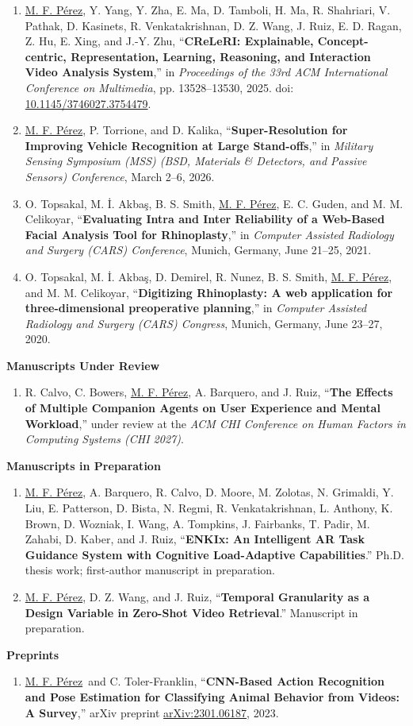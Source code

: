 \documentclass[11pt,letterpaper]{article}
\newcommand{\cvsubsection}[1]{\par\addvspace{7pt}\Needspace{4\baselineskip}\textbf{#1}\par\nobreak\vspace{1pt}}
\newcommand{\pubtitle}[1]{\textbf{#1}}
\newcommand{\me}{\underline{M. F. Pérez}}
\begin{document}
\begin{enumerate}
\item \me, Y. Yang, Y. Zha, E. Ma, D. Tamboli, H. Ma, R. Shahriari, V. Pathak, D. Kasinets, R. Venkatakrishnan, D. Z. Wang, J. Ruiz, E. D. Ragan, Z. Hu, E. Xing, and J.-Y. Zhu, ``\pubtitle{CReLeRI: Explainable, Concept-centric, Representation, Learning, Reasoning, and Interaction Video Analysis System},'' in \textit{Proceedings of the 33rd ACM International Conference on Multimedia}, pp. 13528–13530, 2025. doi: \href{https://doi.org/10.1145/3746027.3754479}{10.1145/3746027.3754479}.
\item \me, P. Torrione, and D. Kalika, ``\pubtitle{Super-Resolution for Improving Vehicle Recognition at Large Stand-offs},'' in \textit{Military Sensing Symposium (MSS) (BSD, Materials \& Detectors, and Passive Sensors) Conference}, March 2–6, 2026.
\item O. Topsakal, M. İ. Akbaş, B. S. Smith, \me, E. C. Guden, and M. M. Celikoyar, ``\pubtitle{Evaluating Intra and Inter Reliability of a Web-Based Facial Analysis Tool for Rhinoplasty},'' in \textit{Computer Assisted Radiology and Surgery (CARS) Conference}, Munich, Germany, June 21–25, 2021.
\item O. Topsakal, M. İ. Akbaş, D. Demirel, R. Nunez, B. S. Smith, \me, and M. M. Celikoyar, ``\pubtitle{Digitizing Rhinoplasty: A web application for three-dimensional preoperative planning},'' in \textit{Computer Assisted Radiology and Surgery (CARS) Congress}, Munich, Germany, June 23–27, 2020.
\end{enumerate}
\cvsubsection{Manuscripts Under Review}
\begin{enumerate}
\item R. Calvo, C. Bowers, \me, A. Barquero, and J. Ruiz, ``\pubtitle{The Effects of Multiple Companion Agents on User Experience and Mental Workload},'' under review at the \textit{ACM CHI Conference on Human Factors in Computing Systems (CHI 2027)}.
\end{enumerate}
\cvsubsection{Manuscripts in Preparation}
\begin{enumerate}
\item \me, A. Barquero, R. Calvo, D. Moore, M. Zolotas, N. Grimaldi, Y. Liu, E. Patterson, D. Bista, N. Regmi, R. Venkatakrishnan, L. Anthony, K. Brown, D. Wozniak, I. Wang, A. Tompkins, J. Fairbanks, T. Padir, M. Zahabi, D. Kaber, and J. Ruiz, ``\pubtitle{ENKIx: An Intelligent AR Task Guidance System with Cognitive Load-Adaptive Capabilities}.'' Ph.D. thesis work; first-author manuscript in preparation.
\item \me, D. Z. Wang, and J. Ruiz, ``\pubtitle{Temporal Granularity as a Design Variable in Zero-Shot Video Retrieval}.'' Manuscript in preparation.
\end{enumerate}
\cvsubsection{Preprints}
\begin{enumerate}
\item \me\ and C. Toler-Franklin, ``\pubtitle{CNN-Based Action Recognition and Pose Estimation for Classifying Animal Behavior from Videos: A Survey},'' arXiv preprint \href{https://arxiv.org/abs/2301.06187}{arXiv:2301.06187}, 2023.
\end{enumerate}
\end{document}
